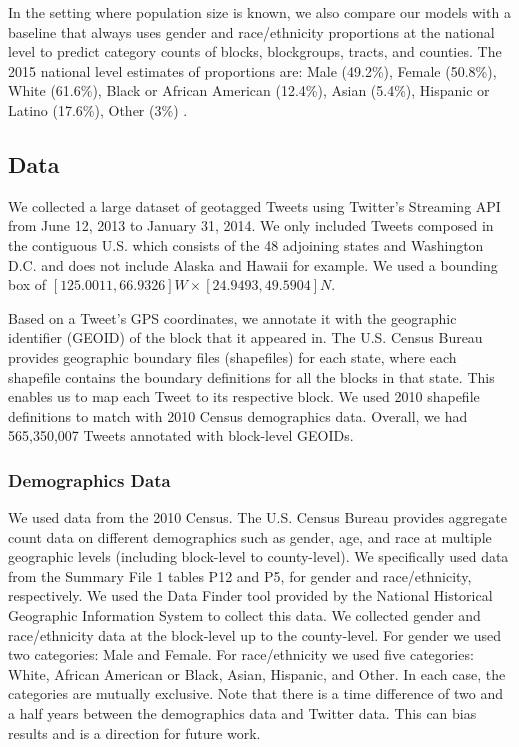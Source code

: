 \documentclass[letterpaper]{article}
\begin{document}
In the setting where population size is known, we also compare our models with a baseline that always uses gender and race/ethnicity proportions at the national level to predict category counts of blocks, blockgroups, tracts, and counties. The 2015 national level estimates of proportions are: Male (49.2\%), Female (50.8\%), White (61.6\%), Black or African American (12.4\%), Asian (5.4\%), Hispanic or Latino (17.6\%), Other (3\%) \cite{census2016}.

\subsection{Data}

We collected a large dataset of geotagged Tweets using Twitter's Streaming API from June 12, 2013 to January 31, 2014. We only included Tweets composed in the contiguous U.S. which consists of the 48 adjoining states and Washington D.C. and does not include Alaska and Hawaii for example. We used a bounding box of $[125.0011,66.9326]W \times [24.9493,49.5904]N$. 

Based on a Tweet's GPS coordinates, we annotate it with the geographic identifier (GEOID) of the block that it appeared in. The U.S. Census Bureau provides geographic boundary files (shapefiles) for each state, where each shapefile contains the boundary definitions for all the blocks in that state. This enables us to map each Tweet to its respective block. We used 2010 shapefile definitions to match with 2010 Census demographics data. Overall, we had 565,350,007 Tweets annotated with block-level GEOIDs. 

\subsubsection{Demographics Data} We used data from the 2010 Census. The U.S. Census Bureau provides aggregate count data on different demographics such as gender, age, and race at multiple geographic levels (including block-level to county-level). We specifically used data from the Summary File 1 tables P12 and P5, for gender and race/ethnicity, respectively. We used the Data Finder tool provided by the National Historical Geographic Information System \cite{data2010} to collect this data. We collected gender and race/ethnicity data at the block-level up to the county-level. For gender we used two categories: Male and Female. For race/ethnicity we used five categories: White, African American or Black, Asian, Hispanic, and Other. In each case, the categories are mutually exclusive. Note that there is a time difference of two and a half years between the demographics data and Twitter data. This can bias results and is a direction for future work. 
\end{document}
